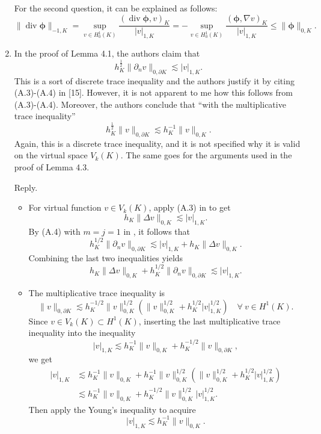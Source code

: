 \documentclass[10pt]{amsart}
\theoremstyle{definition}
\theoremstyle{remark}
\renewcommand{\div}{\operatorname{div}}
\begin{document}
\begin{enumerate}[1.]
For the second question, it can be explained as follows:
$$
\|\div\boldsymbol{\phi}\|_{-1,K}=\sup_{v\in H_0^1(K)}\frac{(\div\boldsymbol{\phi}, v)_K}{|v|_{1,K}}=-\sup_{v\in H_0^1(K)}\frac{(\boldsymbol{\phi}, \nabla v)_K}{|v|_{1,K}} \leq \|\boldsymbol{\phi}\|_{0,K}.
$$

\medskip

\item \textsf{In the proof of Lemma 4.1, the authors claim that
$$
h_K^{\frac{1}{2}}\|\partial_nv\|_{0,\partial K}\lesssim |v|_{1,K}.
$$
This is a sort of discrete trace inequality and the authors justify it by citing (A.3)-(A.4) in [15]. However, it is not apparent to me how this follows from (A.3)-(A.4). Moreover, the authors conclude that “with the multiplicative trace inequality”
$$
h_K^{\frac{1}{2}}\|v\|_{0,\partial K}\lesssim h_K^{-1}\|v\|_{0,K}.
$$
Again, this is a discrete trace inequality, and it is not specified why it is valid on the virtual space $V_k(K)$. The same goes for the arguments used in the proof of Lemma 4.3.}

\smallskip \noindent \textcolor[rgb]{1.00,0.00,0.00}{Reply.}
\begin{itemize}
    \item 
For virtual function $v\in V_k(K)$, apply (A.3) in \cite{ChenHuang2020ncvem} to get
\[
h_K\|\Delta v\|_{0,K}\lesssim |v|_{1,K}.
\]
By (A.4) with $m=j=1$ in \cite{ChenHuang2020ncvem}, it follows that
\[
h_K^{1/2}\|\partial_nv\|_{0,\partial K}\lesssim |v|_{1,K}+h_K\|\Delta v\|_{0,K}.
\]
Combining the last two inequalities yields
\[
h_K\|\Delta v\|_{0,K}+h_K^{1/2}\|\partial_nv\|_{0,\partial K}\lesssim |v|_{1,K}.
\]
\item The multiplicative trace inequality is
\[
\|v\|_{0,\partial K}\lesssim h_K^{-1/2}\|v\|_{0,K}^{1/2}(\|v\|_{0,K}^{1/2}+h_K^{1/2}|v|_{1,K}^{1/2}) \quad\forall~v\in H^1(K).
\]
Since $v\in V_k(K)\subset H^1(K)$, inserting the last multiplicative trace inequality into the inequality
\[
|v|_{1,K}\lesssim h_K^{-1}\|v\|_{0,K}+h_K^{-1/2}\|v\|_{0,\partial K},
\]
we get
\begin{align*}
|v|_{1,K}&\lesssim h_K^{-1}\|v\|_{0,K}+h_K^{-1}\|v\|_{0,K}^{1/2}(\|v\|_{0,K}^{1/2}+h_K^{1/2}|v|_{1,K}^{1/2}) \\
&\lesssim h_K^{-1}\|v\|_{0,K}+h_K^{-1/2}\|v\|_{0,K}^{1/2}|v|_{1,K}^{1/2}.
\end{align*}
Then apply the Young's inequality to acquire
\[
|v|_{1,K}\lesssim h_K^{-1}\|v\|_{0,K}.
\]
\end{itemize}


\medskip


\end{enumerate}
\end{document}
